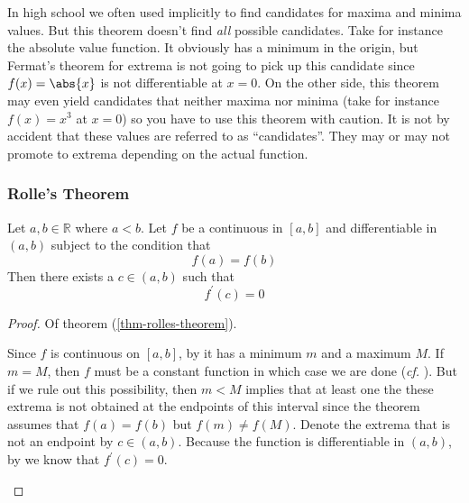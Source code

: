 \begin{rem}
	In high school we often used implicitly 
	to find candidates for maxima and minima values. But this theorem doesn't find
	\textit{all} possible candidates. Take for instance the absolute value function.
	It obviously has a minimum in the origin, but Fermat's theorem for extrema is not
	going to pick up this candidate since $f(x)=\abs{x}$ is not differentiable at $x=0$.
	On the other side, this theorem may even yield candidates that neither maxima nor
	minima (take for instance $f(x)=x^3$ at $x=0$) so you have to use this theorem with
	caution. It is not by accident that these values are referred to as \enquote{candidates}.
	They may or may not promote to extrema depending on the actual function.
\end{rem}

\subsubsection{Rolle's Theorem}\label{subsubsec-rolles-theorem}

\begin{thm}\label{thm-rolles-theorem}
	Let $a,b\in\mathbb{R}$ where $a<b$. Let $f$ be a continuous in $[a,b]$ and
	differentiable in $(a,b)$ subject to the condition \cite[p.169]{wuest2009} that
	\begin{equation*}
		f(a)=f(b)
	\end{equation*}
	Then there exists a $c\in(a,b)$ such that
	\begin{equation}
		f^\prime(c)=0
	\end{equation}
\end{thm}

\begin{proof}
	Of theorem (\ref{thm-rolles-theorem}).
	\begin{flushleft}
		Since $f$ is continuous on $[a,b]$, by 
		it has a minimum $m$ and a maximum $M$. If $m=M$, then $f$ must be a constant
		function in which case we are done (\textit{cf.} ).
		But if we rule out this possibility, then $m<M$ implies that at least one
		the these extrema is not obtained at the endpoints of this interval since the
		theorem assumes that $f(a)=f(b)$ but $f(m)\neq f(M)$. Denote the extrema
		that is not an endpoint by $c\in(a,b)$. Because the function is differentiable
		in $(a,b)$, by  we know that $f^\prime(c)=0$.
	\end{flushleft}
\end{proof}

